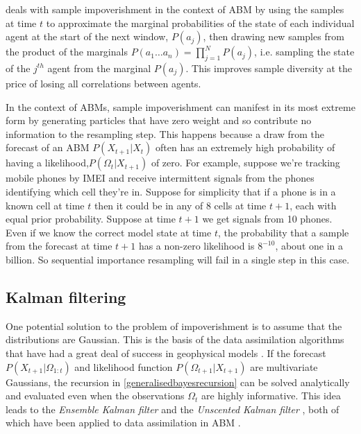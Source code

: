 \documentclass{article}
\begin{document}
\citet{wang_data_2015} deals with sample impoverishment in the context of ABM by using the samples at time $t$ to approximate the marginal probabilities of the state of each individual agent at the start of the next window, $P(a_j)$, then drawing new samples from the product of the marginals $P(a_1 \dots a_n) = \prod_{j=1}^NP(a_j)$, i.e. sampling the state of the $j^{th}$ agent from the marginal $P(a_j)$. This improves sample diversity at the price of losing all correlations between agents. 

In the context of ABMs, sample impoverishment can manifest in its most extreme form by generating particles that have zero weight and so contribute no information to the resampling step. This happens because a draw from the forecast of an ABM $P(X_{t+1}|X_t)$ often has an extremely high probability of having a likelihood,$P(\Omega_t|X_{t+1})$ of zero. For example, suppose we're tracking mobile phones by IMEI and receive intermittent signals from the phones identifying which cell they're in. Suppose for simplicity that if a phone is in a known cell at time $t$ then it could be in any of 8 cells at time $t+1$, each with equal prior probability. Suppose at time $t+1$ we get signals from 10 phones. Even if we know the correct model state at time $t$, the probability that a sample from the forecast at time $t+1$ has a non-zero likelihood is $8^{-10}$, about one in a billion. So sequential importance resampling will fail in a single step in this case.

\subsection{Kalman filtering}
One potential solution to the problem of impoverishment is to assume that the distributions are Gaussian. This is the basis of the data assimilation algorithms that have had a great deal of success in geophysical models \citep*{carrassi2018data, talagrand_assimilation_1997, kalnay_atmospheric_2003, lewis_dynamic_2006}. If the forecast $P(X_{t+1}|\Omega_{1:t})$ and likelihood function $P(\Omega_{t+1}|X_{t+1})$ are multivariate Gaussians, the recursion in \eqref{generalisedbayesrecursion} can be solved analytically and evaluated even when the observations $\Omega_t$ are highly informative. This idea leads to the \textit{Ensemble Kalman filter} \citep{evensen2003ensemble} and the \textit{Unscented Kalman filter} \citep{wan2001unscented}, both of which have been applied to data assimilation in ABM \citep*{ward_dynamic_2016, clay_realtime_2020}.
\end{document}
